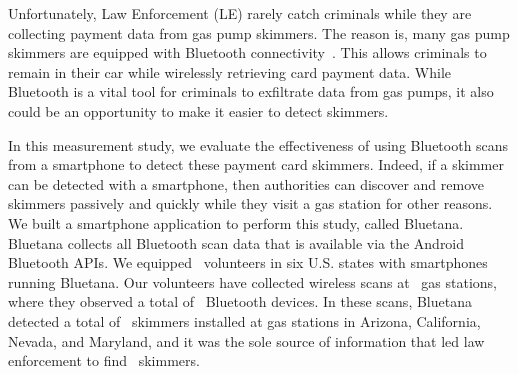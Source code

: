 Unfortunately, Law Enforcement (LE) rarely catch criminals while they are collecting payment data from gas pump skimmers.
%
The reason is, many gas pump skimmers are equipped with Bluetooth connectivity~\cite{krebs-siphoning,krebs-pos,krebs-gang,krebs-mexico}.
%
This allows criminals to remain in their car while wirelessly retrieving card payment data.
%
While Bluetooth is a vital tool for criminals to exfiltrate data from gas
pumps, it also could be an opportunity to make it easier to detect skimmers.


In this measurement study, we evaluate the effectiveness of using Bluetooth scans from a smartphone to detect these payment card skimmers.
%
Indeed, if a skimmer can be detected with 
a smartphone, then authorities can discover and remove
skimmers passively and quickly while they visit a gas station for
other reasons.
% 
We built a smartphone application to perform this study, called Bluetana.
%
Bluetana collects all Bluetooth scan data that is available via
the Android Bluetooth APIs.
%
We equipped \numvolunteers~volunteers in six U.S. states with smartphones
running Bluetana. 
%
Our volunteers have collected wireless scans at \visitedgasstations~gas stations, where
%
they observed a total of \totalbtobserved~Bluetooth devices.
%
In these scans, Bluetana detected a total of \totalskimmers~skimmers
installed at gas stations in Arizona, California, Nevada, and Maryland, and it
%
was the sole source of information
that led law enforcement to find \totalskimmersBluetana~skimmers.
%
%
%

%
%
%

